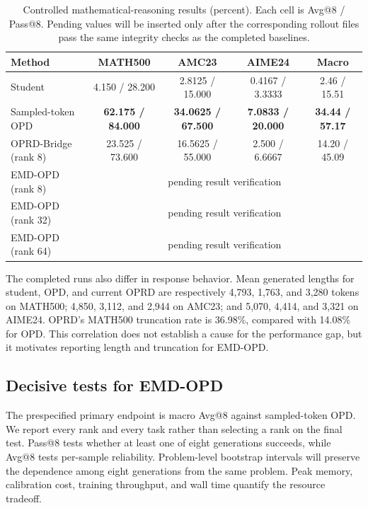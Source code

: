\documentclass[10pt,twocolumn]{article}
\newcommand{\method}{\textsc{EMD-OPD}}
\begin{document}
\begin{table}[t]
\centering
\caption{Controlled mathematical-reasoning results (percent). Each cell is Avg@8 / Pass@8. Pending values will be inserted only after the corresponding rollout files pass the same integrity checks as the completed baselines.}
\label{tab:main}
\small
\begin{tabular}{@{}lcccc@{}}
\toprule
Method & MATH500 & AMC23 & AIME24 & Macro \\
\midrule
Student & 4.150 / 28.200 & 2.8125 / 15.000 & 0.4167 / 3.3333 & 2.46 / 15.51 \\
Sampled-token OPD & \textbf{62.175 / 84.000} & \textbf{34.0625 / 67.500} & \textbf{7.0833 / 20.000} & \textbf{34.44 / 57.17} \\
OPRD-Bridge (rank 8) & 23.525 / 73.600 & 16.5625 / 55.000 & 2.500 / 6.6667 & 14.20 / 45.09 \\
\midrule
\method{} (rank 8) & \multicolumn{4}{c}{pending result verification} \\
\method{} (rank 32) & \multicolumn{4}{c}{pending result verification} \\
\method{} (rank 64) & \multicolumn{4}{c}{pending result verification} \\
\bottomrule
\end{tabular}
\end{table}

The completed runs also differ in response behavior. Mean generated lengths for student, OPD, and current OPRD are respectively 4,793, 1,763, and 3,280 tokens on MATH500; 4,850, 3,112, and 2,944 on AMC23; and 5,070, 4,414, and 3,321 on AIME24. OPRD's MATH500 truncation rate is 36.98\%, compared with 14.08\% for OPD. This correlation does not establish a cause for the performance gap, but it motivates reporting length and truncation for \method{}.

\subsection{Decisive tests for \method{}}

The prespecified primary endpoint is macro Avg@8 against sampled-token OPD. We report every rank and every task rather than selecting a rank on the final test. Pass@8 tests whether at least one of eight generations succeeds, while Avg@8 tests per-sample reliability. Problem-level bootstrap intervals will preserve the dependence among eight generations from the same problem. Peak memory, calibration cost, training throughput, and wall time quantify the resource tradeoff.
\end{document}
